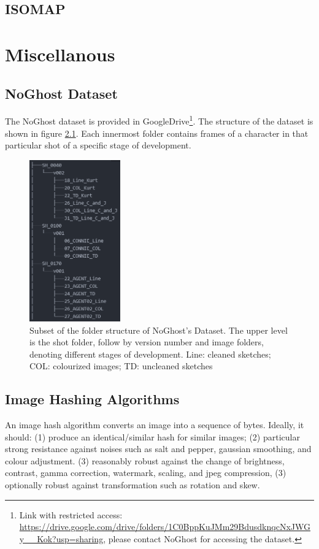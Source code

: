 \section{ISOMAP}
\label{app:stat:isomap}


\chapter{Miscellanous}

\section{NoGhost Dataset}
\label{app:misc:noghostdata}
The NoGhost dataset is provided in GoogleDrive\footnote{Link with restricted access: \url{https://drive.google.com/drive/folders/1C0BppKuJMm29BdusdknqcNxJWGy__Kok?usp=sharing}, please contact NoGhost for accessing the dataset.}. The structure of the dataset is shown in figure \ref{fig:noghost_dataset_structure}. Each innermost folder contains  frames of a character in that particular shot of a specific stage of development.
\begin{figure}
    \centering
    \includegraphics[width=0.35\textwidth]{images/appendix/noghost_dataset_structure.png}
    \caption{Subset of the folder structure of NoGhost's Dataset. The upper level is the shot folder, follow by version number and image folders, denoting different stages of development. Line: cleaned sketches; COL: colourized images; TD: uncleaned sketches}
    \label{fig:noghost_dataset_structure}
\end{figure}

\section{Image Hashing Algorithms}
\label{app:misc:image_hashing}
An image hash algorithm converts an image into a sequence of bytes. Ideally, it should: (1) produce an identical/similar hash for similar images; (2) particular strong resistance against noises such as salt and pepper, gaussian smoothing, and colour adjustment. (3) reasonably robust against the change of brightness, contrast, gamma correction, watermark, scaling, and jpeg compression, (3) optionally robust against transformation such as rotation and skew.

